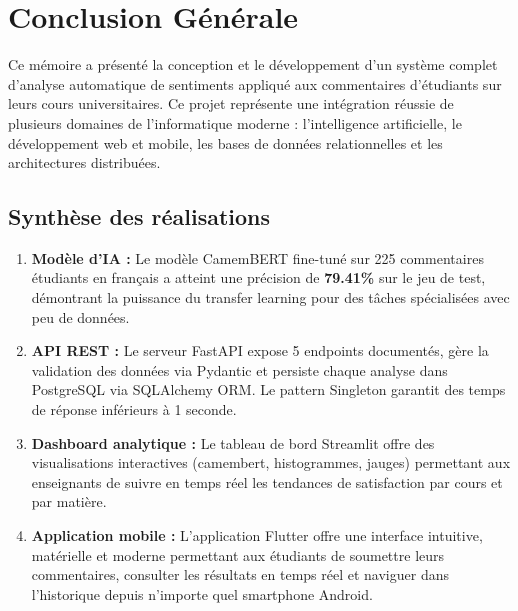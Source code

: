 \chapter*{Conclusion Générale}

\vspace{0.3cm}

Ce mémoire a présenté la conception et le développement d'un système
complet d'analyse automatique de sentiments appliqué aux commentaires
d'étudiants sur leurs cours universitaires. Ce projet représente une
intégration réussie de plusieurs domaines de l'informatique moderne :
l'intelligence artificielle, le développement web et mobile, les bases
de données relationnelles et les architectures distribuées.

\vspace{0.5cm}

\section*{Synthèse des réalisations}

\begin{tcolorbox}[
  enhanced,
  colback=bleuprincipal!5!white,
  colframe=bleuprincipal,
  boxrule=1.5pt, arc=6pt,
  left=10pt, right=10pt, top=8pt, bottom=8pt
]
\begin{enumerate}
  \item \textbf{Modèle d'IA :} Le modèle CamemBERT fine-tuné sur 225
        commentaires étudiants en français a atteint une précision de
        \textbf{79.41\%} sur le jeu de test, démontrant la puissance du
        transfer learning pour des tâches spécialisées avec peu de données.

  \item \textbf{API REST :} Le serveur FastAPI expose 5 endpoints documentés,
        gère la validation des données via Pydantic et persiste chaque analyse
        dans PostgreSQL via SQLAlchemy ORM. Le pattern Singleton garantit
        des temps de réponse inférieurs à 1 seconde.

  \item \textbf{Dashboard analytique :} Le tableau de bord Streamlit offre
        des visualisations interactives (camembert, histogrammes, jauges)
        permettant aux enseignants de suivre en temps réel les tendances
        de satisfaction par cours et par matière.

  \item \textbf{Application mobile :} L'application Flutter offre une
        interface intuitive, matérielle et moderne permettant aux étudiants
        de soumettre leurs commentaires, consulter les résultats en temps réel
        et naviguer dans l'historique depuis n'importe quel smartphone Android.
\end{enumerate}
\end{tcolorbox}

